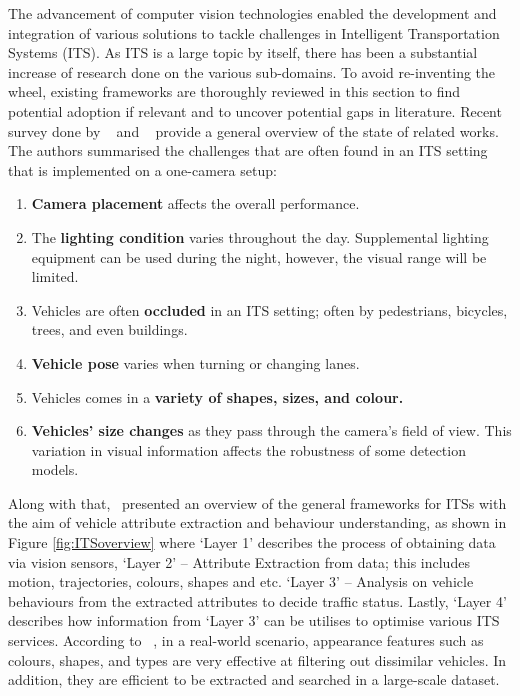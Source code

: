The advancement of computer vision technologies enabled the development and
integration of various solutions to tackle challenges in Intelligent
Transportation Systems (ITS). As ITS is a large topic by itself, there has been a substantial increase of research done on the various sub-domains.
To avoid re-inventing the wheel, existing frameworks are thoroughly reviewed in this section to find potential adoption if relevant and to uncover potential gaps in literature. Recent survey done by ~ and
~ provide a general overview of the state of related works. The authors summarised the challenges that are
often found in an ITS setting that is implemented on a one-camera setup:
\begin{enumerate}[label=(\alph*)]
 \item \textbf{Camera placement} affects the overall performance.
 \item The \textbf{lighting condition} varies throughout the day. Supplemental lighting equipment can be used during the night, however, the visual range will be limited.
  \item Vehicles are often \textbf{occluded} in an ITS setting; often by pedestrians, bicycles, trees, and even buildings.
 \item \textbf{Vehicle pose} varies when turning or changing lanes.
 \item Vehicles comes in a \textbf{variety of shapes, sizes, and colour.}
 \item \textbf{Vehicles' size changes} as they pass through the camera's field of view. This variation in visual information affects the robustness of some detection models.
\end{enumerate}
Along with that,~ presented an overview of the
general frameworks for ITSs with the aim of vehicle attribute extraction and
behaviour understanding, as shown in Figure \ref{fig:ITSoverview} where `Layer 1' describes the process of obtaining data via vision sensors, `Layer 2' -- Attribute
Extraction from data; this includes motion, trajectories, colours, shapes
and etc. `Layer 3' -- Analysis on vehicle behaviours from the extracted
attributes to decide traffic status. Lastly, `Layer 4' describes how information from `Layer 3' can be utilises to optimise various ITS services. 
According to
~, in a real-world scenario, appearance features such as
colours, shapes, and types are very effective at filtering out dissimilar
vehicles. In addition, they are efficient to be extracted and searched in a 
large-scale dataset. 

